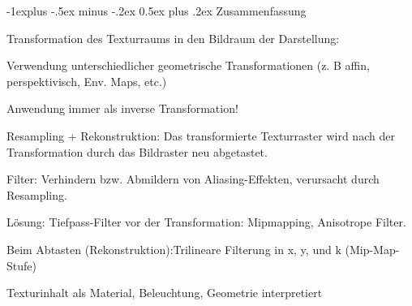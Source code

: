 \documentclass[landscape]{article}
\makeatletter
\renewcommand{\subsection}{\@startsection{subsection}{2}{0mm}%
                                {-1explus -.5ex minus -.2ex}%
                                {0.5ex plus .2ex}%
                                {\normalfont\normalsize\bfseries}}
\makeatother
\begin{document}
\begin{multicols}{3}
  \subsection{ Zusammenfassung}
  \begin{itemize*}
    \item Transformation des Texturraums in den Bildraum der Darstellung:
    \item Verwendung unterschiedlicher geometrische Transformationen (z. B affin, perspektivisch, Env. Maps, etc.)
    \item Anwendung immer als inverse Transformation!
    \item Resampling + Rekonstruktion: Das transformierte Texturraster wird nach der Transformation durch das Bildraster neu abgetastet.
    \item Filter: Verhindern bzw. Abmildern von Aliasing-Effekten, verursacht durch Resampling.
    \item Lösung: Tiefpass-Filter vor der Transformation: Mipmapping, Anisotrope Filter.
    \item Beim Abtasten (Rekonstruktion):Trilineare Filterung in x, y, und k (Mip-Map-Stufe)
    \item Texturinhalt als Material, Beleuchtung, Geometrie interpretiert
  \end{itemize*}
  
\end{multicols}
\newpage
\end{document}
